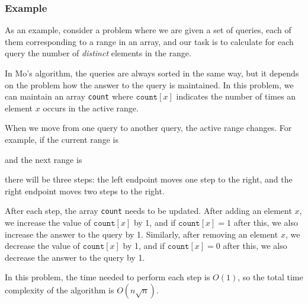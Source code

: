 \subsubsection*{Example}

As an example, consider a problem
where we are given a set of queries,
each of them corresponding to a range in an array,
and our task is to calculate for each query
the number of \emph{distinct} elements in the range.

In Mo's algorithm, the queries are always sorted
in the same way, but it depends on the problem
how the answer to the query is maintained.
In this problem, we can maintain an array 
\texttt{count} where $\texttt{count}[x]$
indicates the number of times an element $x$
occurs in the active range.

When we move from one query to another query,
the active range changes.
For example, if the current range is
\begin{center}
\end{center}
and the next range is
\begin{center}
\end{center}
there will be three steps:
the left endpoint moves one step to the right,
and the right endpoint moves two steps to the right.

After each step, the array \texttt{count}
needs to be updated.
After adding an element $x$,
we increase the value of 
$\texttt{count}[x]$ by 1,
and if $\texttt{count}[x]=1$ after this,
we also increase the answer to the query by 1.
Similarly, after removing an element $x$,
we decrease the value of 
$\texttt{count}[x]$ by 1,
and if $\texttt{count}[x]=0$ after this,
we also decrease the answer to the query by 1.

In this problem, the time needed to perform
each step is $O(1)$, so the total time complexity
of the algorithm is $O(n \sqrt n)$.